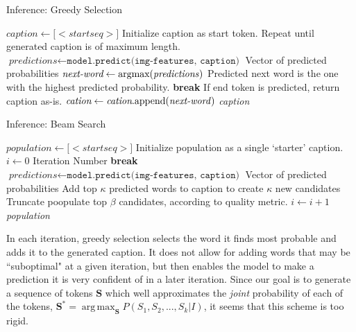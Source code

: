 \documentclass[letterpaper, 10 pt, conference]{ieeeconf}
\DeclareMathOperator*{\argmax}{arg\,max}
\begin{document}
\begin{algorithm*}[h]
\caption{Inference: Greedy Selection}\label{greedy-sampling}
\begin{algorithmic}[1]
\State $\textit{caption} \gets \text{[}<startseq>\text{]}$
\Comment Initialize caption as start token.
\Comment Repeat until generated caption is of maximum length.
\State $\textit{predictions} \gets \texttt{model.predict(img-features, caption)}$
\Comment Vector of predicted probabilities
\State $\textit{next-word} \gets \text{argmax(\textit{predictions})}$
\Comment Predicted next word is the one with the highest predicted probability.
\State \textbf{break}
\Comment If end token is predicted, return caption as-is.
\Else
\State $\textit{cation} \gets \textit{cation}\text{.append(\textit{next-word})}$
\EndIf
\EndWhile
\Return \textit{caption}
\EndProcedure
\end{algorithmic}
\end{algorithm*}


\begin{algorithm*}[h]
\caption{Inference: Beam Search}\label{beam-search}
\begin{algorithmic}[1]
\State $\textit{population} \gets \text{[}<startseq>\text{]}$
\Comment Initialize population as a single `starter' caption.
\State $i \gets 0$
\Comment Iteration Number
\State \textbf{break}
\EndIf
\State $\textit{predictions} \gets \texttt{model.predict(img-features, caption)}$
\Comment Vector of predicted probabilities
\State Add top $\kappa$ predicted words to caption to create $\kappa$ new candidates
\EndFor
\State Truncate poopulate top $\beta$ candidates, according to quality metric.
\State $i \gets i + 1$
\EndFor
\Return \textit{population}
\EndProcedure
\end{algorithmic}
\end{algorithm*}

In each iteration, greedy selection selects the word it finds most probable and adds it to the generated caption. It does not allow for adding words that may be ``suboptimal" at a given iteration, but then enables the model to make a prediction it is very confident of in a later iteration. Since our goal is to generate a sequence of tokens $\textbf{S}$ which well approximates the \textit{joint} probability of each of the tokens, $\textbf{S}^* = \argmax_{\textbf{S}}{P(S_1, S_2, ..., S_k|I)}$, it seems that this scheme is too rigid. 
\end{document}
